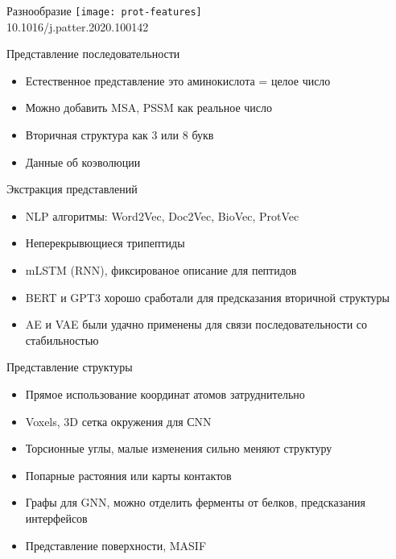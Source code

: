 \begin{frame}{Разнообразие}
\centering
 \texttt{[image: prot-features]} \\
 \footnotesize 10.1016/j.patter.2020.100142
\end{frame}

\begin{frame}{Представление  последовательности}
    \begin{itemize}
        \item Естественное представление это аминокислота = целое число
        \item Можно добавить MSA, PSSM как реальное число
        \item Вторичная структура как 3 или 8 букв
        \item Данные об коэволюции
    \end{itemize}
\end{frame}

\begin{frame}{Экстракция представлений}
    \begin{itemize}
        \item NLP алгоритмы:  Word2Vec, Doc2Vec, BioVec, ProtVec
        \item Неперекрывющиеся трипептиды  
        \item mLSTM (RNN), фиксированое описание для пептидов
        \item BERT и GPT3 хорошо сработали для предсказания вторичной структуры
        \item AE и VAE были удачно применены для связи последовательности со стабильностью
    \end{itemize}
\end{frame}

\begin{frame}{Представление структуры}
    \begin{itemize}
        \item Прямое использование координат атомов затруднительно
        \item Voxels, 3D сетка окружения для СNN
        \item Торсионные углы, малые изменения сильно меняют структуру
        \item Попарные растояния или карты контактов
        \item Графы для GNN, можно отделить ферменты от белков, предсказания интерфейсов
        \item Представление поверхности, MASIF
    \end{itemize}
\end{frame}

